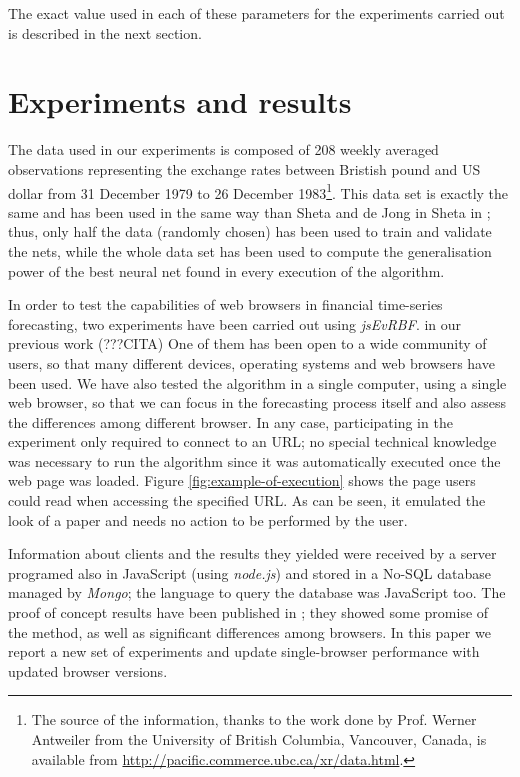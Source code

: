 \documentclass{article}
\begin{document}
The exact value used in each of these parameters for the experiments carried out is described in the next section.
\section{Experiments and results}
\label{sec:experiments}
The data used in our experiments is composed of 208
weekly averaged observations representing the exchange rates between
Bristish pound and US dollar from 31 December 1979 to 26 December
1983\footnote{The source of the information, thanks to the work done
  by Prof. Werner Antweiler from the University of British Columbia,
  Vancouver, Canada, is available from
  \url{http://pacific.commerce.ubc.ca/xr/data.html}.}. This data set is exactly the same and
has been used in the same way than Sheta and de Jong in Sheta in
\cite{Sheta2001}; thus,  only half the
data (randomly chosen) has been used to train and validate the nets,
while the whole data set has been used to compute the generalisation power of the best neural net found in every execution of the algorithm.

In order to test the capabilities of web browsers in financial time-series forecasting,
two experiments have been carried out using {\em jsEvRBF}.  in our previous work (???CITA) One of them
has been open to a wide community of users, so that many different
devices, operating systems and web browsers have been used.  We have
also tested the algorithm in a single computer, using a single web
browser, so that we can focus in the forecasting process itself and
also assess the differences among different browser.
In any case, participating in the experiment only required to connect
to an URL; no special technical knowledge was necessary to run the
algorithm since it was automatically executed once the web page was
loaded. Figure \ref{fig:example-of-execution} shows the page users
could read when accessing the specified URL.  As can be seen, it
emulated the look of a paper and needs no action to be performed by
the user.

Information about clients and the results they yielded were received
by a server programed also in JavaScript (using {\em node.js}) and
stored in a No-SQL database managed by {\em Mongo}; the language to
query the database was JavaScript too. The proof of concept results
have been published in \cite{DBLP:conf/dcai/2016de}; they showed some
promise of the method, as well as significant differences among
browsers. In this paper we report a new set of experiments and update
single-browser performance with updated browser versions.
\end{document}
